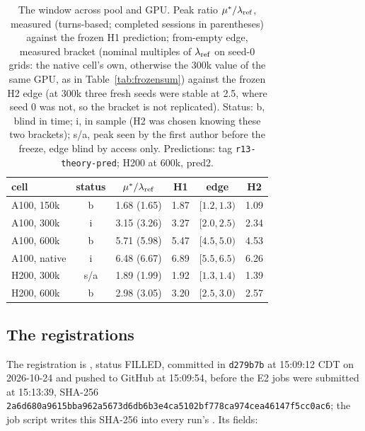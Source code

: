 \begin{table}[t]
\centering\footnotesize
\caption{The window across pool and GPU. Peak ratio $\mu^*/\lambda_{\mathrm{ref}}$, measured (turns-based; completed sessions in parentheses) against the frozen H1 prediction; from-empty edge, measured bracket (nominal multiples of $\lambda_{\mathrm{ref}}$ on seed-0 grids: the native cell's own, otherwise the 300k value of the same GPU, as in Table~\ref{tab:frozensum}) against the frozen H2 edge (at 300k three fresh seeds were stable at 2.5, where seed 0 was not, so the bracket is not replicated). Status: b, blind in time; i, in sample (H2 was chosen knowing these two brackets); s/a, peak seen by the first author before the freeze, edge blind by access only. Predictions: tag \texttt{r13-theory-pred}; H200 at 600k, pred2.}\label{tab:windowlaw}
\setlength{\tabcolsep}{3pt}
\begin{tabular}{@{}l c c c c c@{}}
\toprule
cell & status & $\mu^*/\lambda_{\mathrm{ref}}$ & H1 & edge & H2\\
\midrule
A100, 150k & b & 1.68 (1.65) & 1.87 & $[1.2,1.3)$ & 1.09\\
A100, 300k & i & 3.15 (3.26) & 3.27 & $[2.0,2.5)$ & 2.34\\
A100, 600k & b & 5.71 (5.98) & 5.47 & $[4.5,5.0)$ & 4.53\\
A100, native & i & 6.48 (6.67) & 6.89 & $[5.5,6.5)$ & 6.26\\
H200, 300k & s/a & 1.89 (1.99) & 1.92 & $[1.3,1.4)$ & 1.39\\
H200, 600k & b & 2.98 (3.05) & 3.20 & $[2.5,3.0)$ & 2.57\\
\bottomrule
\end{tabular}
\end{table}

\subsection{The registrations}\label{app:prereg}

The registration is , status FILLED, committed in \texttt{d279b7b} at 15:09:12 CDT on 2026-10-24 and pushed to GitHub at 15:09:54, before the E2 jobs were submitted at 15:13:39, SHA-256 \texttt{2a6d680a9615bba962a5673d6db6b3e4\allowbreak ca5102bf778ca974cea46147f5cc0ac6}; the job script writes this SHA-256 into every run's . Its fields:

